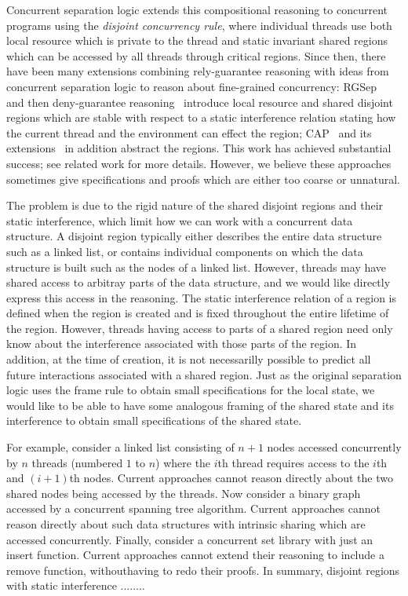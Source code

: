 Concurrent separation logic extends this compositional reasoning  to concurrent programs
using the {\em disjoint concurrency rule}, where individual threads
  use both local resource which is private to the thread and static
invariant shared regions which can be accessed by all threads through
critical regions. Since
then, there have been many extensions combining rely-guarantee
reasoning with ideas from concurrent separation logic to reason about
fine-grained concurrency: RGSep~\cite{viktor-marriage} and then
deny-guarantee reasoning~\cite{dg} introduce local resource and shared
disjoint regions which are stable with respect to a static  interference
relation stating how the current thread and the environment can effect
the region; CAP~\cite{cap-ecoop10} and its
extensions~\cite{hocap,icap,tada} in addition abstract the
regions. This work has achieved substantial success; see related work
for more details. However,  we believe these approaches sometimes   give
specifications and proofs which are either too coarse  or unnatural.



The problem is due to the rigid nature of the shared disjoint regions and
their static interference, which   limit how we can  work
with a
concurrent data structure. A disjoint region typically either describes 
the entire data structure such as a linked list,  or contains
individual 
components on which the data structure is built such as the nodes of a
linked list. However, threads may have shared access to arbitray 
parts of the data structure, and we would like directly express this
access  in
the reasoning. 
The   static interference relation of a region 
 is defined when
the region  is created and    is fixed throughout the entire lifetime of
the region. However, 
threads having access to parts of a shared region need  only
 know about the interference associated with those parts of the
region. In addition, 
at the time  of creation, it is not necessarilly possible
to predict all future interactions  associated with  a shared
region. Just as the original separation logic  uses the frame rule to
obtain small specifications for the local state, we would like to be
able to have some analogous framing of the shared state and its
interference  to obtain small
specifications of the shared state. 


For example, consider a linked list consisting of $n+1$ nodes accessed
concurrently by $n$ threads (numbered $1$ to $n$) where the $i$th
thread requires access to the $i$th and $(i+1)$th nodes. Current
approaches cannot reason directly about the two shared nodes being accessed
by the threads. 
Now consider a binary graph accessed by a concurrent
spanning tree algorithm. Current approaches cannot reason directly
about such  data structures with intrinsic sharing which are
accessed concurrently. Finally, consider a concurrent set library
with just  an
insert function. Current approaches cannot extend their reasoning to
include a remove function, withouthaving to  redo their
proofs. In summary, disjoint regions with static interference ........





